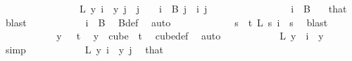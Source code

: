 \begin{isabellebody}
\ \ \ \ \ \ \isamarkupfalse%
\isanewline
\isanewline
\ \ \ \ \ \ \isamarkupfalse%
\ \isamarkupfalse%
\ {\isachardoublequoteopen}{\isacharparenleft}{\kern0pt}{\isacharquery}{\kern0pt}L\ y{\isacharparenright}{\kern0pt}\ i\ {\isacharequal}{\kern0pt}\ y\ j{\isachardoublequoteclose}\ \ {\isachardoublequoteopen}j\ {\isacharless}{\kern0pt}\ {}{\isachardoublequoteclose}\ \ {\isachardoublequoteopen}i\ {\isasymin}\ B\ j{\isachardoublequoteclose}\ \ i\ j\isanewline
\ \ \ \ \ \ \isamarkupfalse%
{\isacharminus}{\kern0pt}\isanewline
\ \ \ \ \ \ \ \ \isamarkupfalse%
\ {\isachardoublequoteopen}i\ {\isasymin}\ B\ {}{\isachardoublequoteclose}\ \isamarkupfalse%
\ that\ \isamarkupfalse%
\ blast\isanewline
\ \ \ \ \ \ \ \ \isamarkupfalse%
\ \isamarkupfalse%
\ {\isachardoublequoteopen}i\ {\isasymin}\ {\isacharquery}{\kern0pt}B{}{\isachardoublequoteclose}\ \isamarkupfalse%
\ B{\isacharunderscore}{\kern0pt}def\ \isamarkupfalse%
\ auto\ \isanewline
\ \ \ \ \ \ \ \ \isamarkupfalse%
\ \isamarkupfalse%
\ {\isachardoublequoteopen}{\isacharparenleft}{\kern0pt}{\isasymforall}s\ {\isacharless}{\kern0pt}\ t{\isachardot}{\kern0pt}\ L\ s\ i\ {\isacharequal}{\kern0pt}\ s{\isacharparenright}{\kern0pt}{\isachardoublequoteclose}\ \isamarkupfalse%
\ blast\isanewline
\ \ \ \ \ \ \ \ \isamarkupfalse%
\ \isamarkupfalse%
\ {\isachardoublequoteopen}y\ {}\ {\isacharless}{\kern0pt}\ t{\isachardoublequoteclose}\ \isamarkupfalse%
\ {\isacartoucheopen}y\ {\isasymin}\ cube\ {}\ t{\isacartoucheclose}\ \isamarkupfalse%
\ cube{\isacharunderscore}{\kern0pt}def\ \isamarkupfalse%
\ auto\isanewline
\ \ \ \ \ \ \ \ \isamarkupfalse%
\ \isamarkupfalse%
\ {\isachardoublequoteopen}L\ {\isacharparenleft}{\kern0pt}y\ {}{\isacharparenright}{\kern0pt}\ i\ {\isacharequal}{\kern0pt}\ y\ {}{\isachardoublequoteclose}\ \isamarkupfalse%
\ simp\isanewline
\ \ \ \ \ \ \ \ \isamarkupfalse%
\ \isamarkupfalse%
\ {\isachardoublequoteopen}{\isacharquery}{\kern0pt}L\ y\ i\ {\isacharequal}{\kern0pt}\ y\ j{\isachardoublequoteclose}\ \isamarkupfalse%
\ that\ \isamarkupfalse%

\end{isabellebody}
